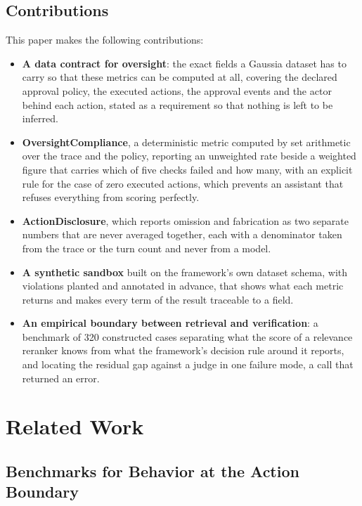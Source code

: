\documentclass[11pt,a4paper]{article}
\begin{document}
\subsection{Contributions}

This paper makes the following contributions:

\begin{itemize}
  \item \textbf{A data contract for oversight}: the exact fields a Gaussia dataset
  has to carry so that these metrics can be computed at all, covering the declared
  approval policy, the executed actions, the approval events and the actor behind
  each action, stated as a requirement so that nothing is left to be inferred.
  \item \textbf{OversightCompliance}, a deterministic metric computed by set
  arithmetic over the trace and the policy, reporting an unweighted rate beside a
  weighted figure that carries which of five checks failed and how many, with an
  explicit rule for the case of zero executed actions, which prevents an assistant
  that refuses everything from scoring perfectly.
  \item \textbf{ActionDisclosure}, which reports omission and fabrication as two
  separate numbers that are never averaged together, each with a denominator taken
  from the trace or the turn count and never from a model.
  \item \textbf{A synthetic sandbox} built on the framework's own dataset schema,
  with violations planted and annotated in advance, that shows what each metric
  returns and makes every term of the result traceable to a field.
  \item \textbf{An empirical boundary between retrieval and verification}: a
  benchmark of 320 constructed cases separating what the score of a relevance
  reranker knows from what the framework's decision rule around it reports, and
  locating the residual gap against a judge in one failure mode, a call that returned
  an error.
\end{itemize}
\section{Related Work}

\subsection{Benchmarks for Behavior at the Action Boundary}
\end{document}
